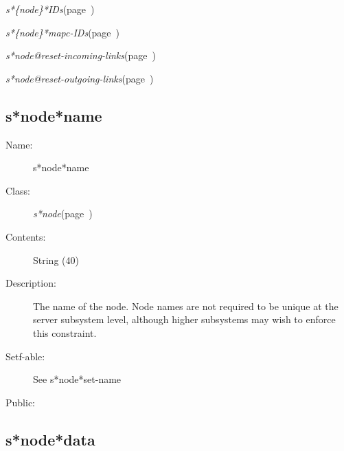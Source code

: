\begin{description}
\item {\sl s*\{node\}*IDs}\hfill(page~\pageref{s*node*IDs})
\item {\sl s*\{node\}*mapc-IDs}\hfill(page~\pageref{s*node*mapc-IDs})

\item {\sl s*node@reset-incoming-links}\hfill(page~\pageref{s*node@reset-incoming-links})
\item {\sl s*node@reset-outgoing-links}\hfill(page~\pageref{s*node@reset-outgoing-links})



\item [Collections:]

\item [Subclasses:]

\item [Superclasses:]



\end{description}
\horizontalline

\subsection{s*node*name}
\label{s*node*name}

\begin{description}

\item [Name:]  s*node*name

\item [Class:] {\sl s*node}\hfill(page~\pageref{s*node}) 

\item [Contents:] String (40)

\item [Description:]
The name of the node. Node names are not
required to be unique at the server subsystem
level, although higher subsystems may wish to
enforce this constraint.

\item [Setf-able:] See s*node*set-name

\item [Public:]



\end{description}
\horizontalline

\subsection{s*node*data}
\label{s*node*data}

